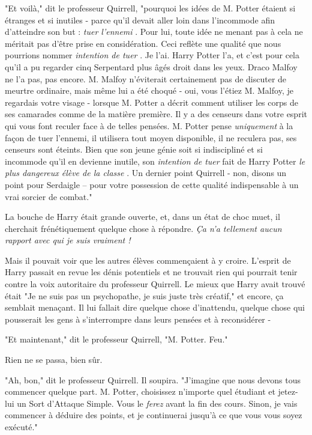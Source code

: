 "Et voilà," dit le professeur Quirrell, "pourquoi les idées de M. Potter étaient si étranges et si inutiles - parce qu'il devait aller loin dans l'incommode afin d'atteindre son but : \emph{tuer l'ennemi} . Pour lui, toute idée ne menant pas à cela ne méritait pas d'être prise en considération. Ceci reflète une qualité que nous pourrions nommer \emph{intention de tuer} . Je l'ai. Harry Potter l'a, et c'est pour cela qu'il a pu regarder cinq Serpentard plus âgés droit dans les yeux. Draco Malfoy ne l'a pas, pas encore. M. Malfoy n'éviterait certainement pas de discuter de meurtre ordinaire, mais même lui a été choqué - oui, vous l'étiez M. Malfoy, je regardais votre visage - lorsque M. Potter a décrit comment utiliser les corps de ses camarades comme de la matière première. Il y a des censeurs dans votre esprit qui vous font reculer face à de telles pensées. M. Potter pense \emph{uniquement}  à la façon de tuer l'ennemi, il utilisera tout moyen disponible, il ne reculera pas, ses censeurs sont éteints. Bien que son jeune génie soit si indiscipliné et si incommode qu'il en devienne inutile, son \emph{intention de tuer}  fait de Harry Potter \emph{le plus dangereux élève de la classe} . Un dernier point Quirrell - non, disons un point pour Serdaigle – pour votre possession de cette qualité indispensable à un vrai sorcier de combat."

La bouche de Harry était grande ouverte, et, dans un état de choc muet, il cherchait frénétiquement quelque chose à répondre. \emph{Ça n'a tellement aucun rapport avec qui je suis vraiment !} 

Mais il pouvait voir que les autres élèves commençaient à y croire. L'esprit de Harry passait en revue les dénis potentiels et ne trouvait rien qui pourrait tenir contre la voix autoritaire du professeur Quirrell. Le mieux que Harry avait trouvé était "Je ne suis pas un psychopathe, je suis juste très créatif," et encore, ça semblait menaçant. Il lui fallait dire quelque chose d'inattendu, quelque chose qui pousserait les gens à s'interrompre dans leurs pensées et à reconsidérer -

"Et maintenant," dit le professeur Quirrell, "M. Potter. Feu."

Rien ne se passa, bien sûr.

"Ah, bon," dit le professeur Quirrell. Il soupira. "J'imagine que nous devons tous commencer quelque part. M. Potter, choisissez n'importe quel étudiant et jetez-lui un Sort d'Attaque Simple. Vous le \emph{ferez}  avant la fin des cours. Sinon, je vais commencer à déduire des points, et je continuerai jusqu'à ce que vous vous soyez exécuté."

